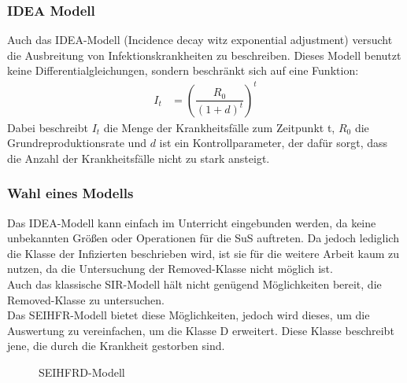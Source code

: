 \subsubsection{IDEA Modell}
\ellen
Auch das IDEA-Modell (Incidence decay witz exponential adjustment) versucht die Ausbreitung von Infektionskrankheiten zu beschreiben. Dieses Modell benutzt keine Differentialgleichungen, sondern beschränkt sich auf eine Funktion:\\
\begin{align}
I_t &=(\dfrac{R_0}{(1+d)^t})^t
\end{align}
Dabei beschreibt $I_t$ die Menge der Krankheitsfälle zum Zeitpunkt t, $R_0$ die Grundreproduktionsrate und $d$ ist ein Kontrollparameter, der dafür sorgt, dass die Anzahl der Krankheitsfälle nicht zu stark ansteigt. 
\subsubsection{Wahl eines Modells}
Das IDEA-Modell kann einfach im Unterricht eingebunden werden, da keine unbekannten Größen oder Operationen für die SuS auftreten. Da jedoch lediglich die Klasse der Infizierten beschrieben wird, ist sie für die weitere Arbeit kaum zu nutzen, da die Untersuchung der Removed-Klasse nicht möglich ist.\\
 Auch das klassische SIR-Modell hält nicht genügend Möglichkeiten bereit, die Removed-Klasse zu untersuchen.\\
  Das SEIHFR-Modell bietet diese Möglichkeiten, jedoch wird dieses, um die Auswertung zu vereinfachen, um die Klasse D erweitert. Diese Klasse beschreibt jene, die durch die Krankheit gestorben sind. 
  \begin{figure}
\begin{center}
\end{center}
\caption{SEIHFRD-Modell}\label{fig:ssec:model}
\end{figure}
